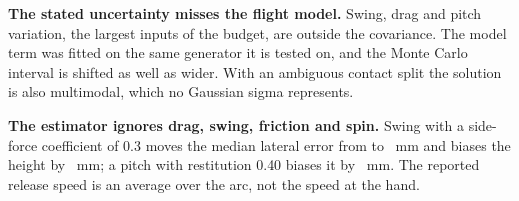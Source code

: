 \textbf{The stated uncertainty misses the flight model.} Swing, drag and pitch variation, the largest
inputs of the budget, are outside the covariance. The model term was
fitted on the same generator it is tested on, and the Monte Carlo interval is shifted as well as wider. With
an ambiguous contact split the solution is also multimodal, which no Gaussian sigma represents.

\textbf{The estimator ignores drag, swing, friction and spin.} Swing with a side-force coefficient of 0.3
moves the median lateral error from \PhysBaselineMedY{} to \PhysSwingCsZeroThreeMedY~mm and biases the
height by \PhysSwingCsZeroThreeMeanZ~mm; a pitch with restitution 0.40 biases it by
\PhysRestitutionZeroFourZeroMeanZ~mm. The reported release speed is an average over the arc, not the speed
at the hand.
